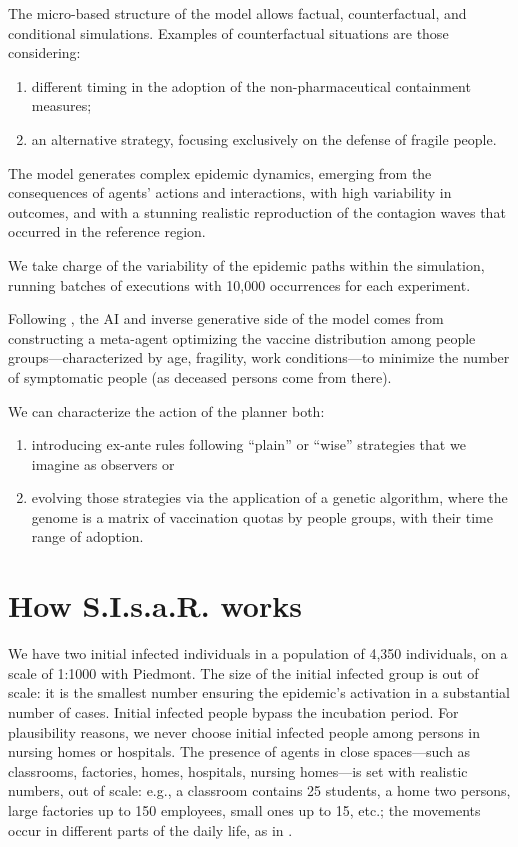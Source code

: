 \documentclass[graybox]{svmult}
\begin{document}
The micro-based structure of the model allows factual, counterfactual, and conditional simulations. Examples of counterfactual situations are those considering:

\begin{enumerate}[label=\roman*]
\item different timing in the adoption of the non-pharmaceutical containment measures;
\item an alternative strategy, focusing exclusively on the defense of fragile people.
\end{enumerate}

The model generates complex epidemic dynamics, emerging from the consequences of agents' actions and interactions, with high variability in outcomes, and with a stunning realistic reproduction of the contagion waves that occurred in the reference region. 

We take charge of the variability of the epidemic paths within the simulation, running batches of executions with 10,000 occurrences for each experiment.

Following \cite{inverseGen}, the AI and inverse generative side of the model comes from constructing a meta-agent optimizing the vaccine distribution among people groups---characterized by age, fragility, work conditions---to minimize the number of symptomatic people (as deceased persons come from there).

We can characterize the action of the planner both:
\begin{enumerate}[label=\roman*]
\item introducing ex-ante rules following ``plain'' or ``wise'' strategies that we imagine as observers or
\item evolving those strategies via the application of a genetic algorithm, where the genome is a matrix of vaccination quotas by people groups, with their time range of adoption. 
\end{enumerate}


\section{How S.I.s.a.R. works}
\label{howWorks}

We have two initial infected individuals in a population of 4,350 individuals, on a scale of 1:1000 with Piedmont. The size of the initial infected group is out of scale: it is the smallest number ensuring the epidemic's activation in a substantial number of cases. Initial infected people bypass the incubation period. For plausibility reasons, we never choose initial infected people among persons in nursing homes or hospitals. The presence of agents in close spaces---such as classrooms, factories, homes, hospitals, nursing homes---is set with realistic numbers, out of scale: e.g., a classroom contains 25 students, a home two persons, large factories up to 150 employees, small ones up to 15, etc.; the movements occur in different parts of the daily life, as in \cite{ghorbani2020assocc}.
\end{document}
